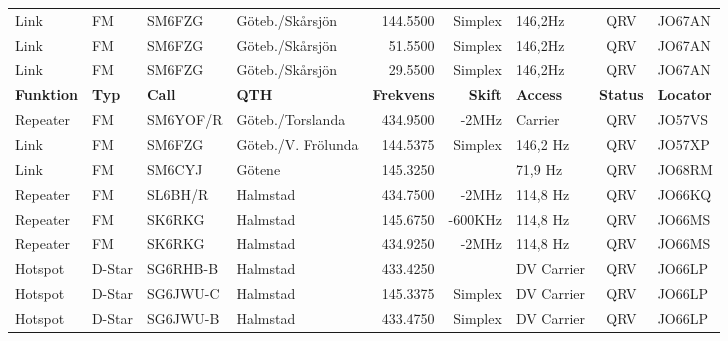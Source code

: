 \begin{landscape}
\begin{longtable}{llllrrlcl}
	Link              & FM           & SM6FZG        & Göteb./Skårsjön     &          144.5500 &        Simplex & 146,2Hz         &       QRV       & JO67AN           \\
	Link              & FM           & SM6FZG        & Göteb./Skårsjön     &           51.5500 &        Simplex & 146,2Hz         &       QRV       & JO67AN           \\
	Link              & FM           & SM6FZG        & Göteb./Skårsjön     &           29.5500 &        Simplex & 146,2Hz         &       QRV       & JO67AN           \\
		\textbf{Funktion} & \textbf{Typ} & \textbf{Call} & \textbf{QTH}        & \textbf{Frekvens} & \textbf{Skift} & \textbf{Access} & \textbf{Status} & \textbf{Locator} \\ \hline
	Repeater          & FM           & SM6YOF/R      & Göteb./Torslanda    &          434.9500 &          -2MHz & Carrier         &       QRV       & JO57VS           \\
	Link              & FM           & SM6FZG        & Göteb./V. Frölunda  &          144.5375 &        Simplex & 146,2 Hz        &       QRV       & JO57XP           \\
	Link              & FM           & SM6CYJ        & Götene              &          145.3250 &                & 71,9 Hz         &       QRV       & JO68RM           \\
	Repeater          & FM           & SL6BH/R       & Halmstad            &          434.7500 &          -2MHz & 114,8 Hz        &       QRV       & JO66KQ           \\
	Repeater          & FM           & SK6RKG        & Halmstad            &          145.6750 &        -600KHz & 114,8 Hz        &       QRV       & JO66MS           \\
	Repeater          & FM           & SK6RKG        & Halmstad            &          434.9250 &          -2MHz & 114,8 Hz        &       QRV       & JO66MS           \\
	Hotspot           & D-Star       & SG6RHB-B      & Halmstad            &          433.4250 &                & DV Carrier      &       QRV       & JO66LP           \\
	Hotspot           & D-Star       & SG6JWU-C      & Halmstad            &          145.3375 &        Simplex & DV Carrier      &       QRV       & JO66LP           \\
	Hotspot           & D-Star       & SG6JWU-B      & Halmstad            &          433.4750 &        Simplex & DV Carrier      &       QRV       & JO66LP           \\

\end{longtable}
\end{landscape}
